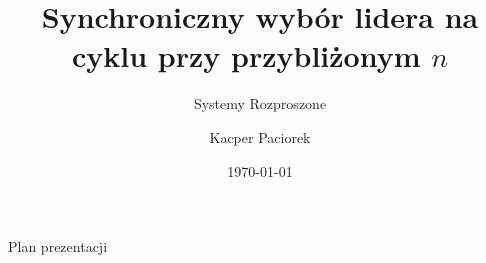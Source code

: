 \documentclass[aspectratio=169,11pt]{beamer}
\title{Synchroniczny wybór lidera na cyklu przy przybliżonym $n$}
\subtitle{Systemy Rozproszone}
\author{Kacper Paciorek}
\date{\today}
\begin{document}
\maketitle

\begin{frame}{Plan prezentacji}
  \tableofcontents
\end{frame}




\end{document}
